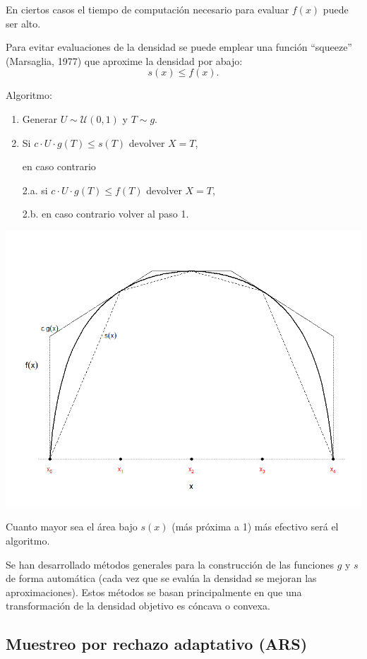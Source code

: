 \documentclass[
]{book}
\theoremstyle{break}
\theoremstyle{definition}
\theoremstyle{definition}
\theoremstyle{definition}
\theoremstyle{remark}
\begin{document}
En ciertos casos el tiempo de computación necesario para evaluar \(f(x)\) puede ser alto.

Para evitar evaluaciones de la densidad se puede emplear una función ``squeeze'' (Marsaglia, 1977) que aproxime la densidad por abajo:
\[s(x)\leq f(x).\]

Algoritmo:

\begin{enumerate}
\def\labelenumi{\arabic{enumi}.}
\item
  Generar \(U \sim \mathcal{U}(0, 1)\) y \(T\sim g\).
\item
  Si \(c\cdot U\cdot g\left( T\right) \leq s\left( T\right)\) devolver \(X=T\),

  en caso contrario

  2.a. si \(c\cdot U\cdot g\left( T\right) \leq f\left( T\right)\)
  devolver \(X=T\),

  2.b. en caso contrario volver al paso 1.
\end{enumerate}

\begin{center}\includegraphics[width=0.7\linewidth]{images/squeeze} \end{center}

Cuanto mayor sea el área bajo \(s(x)\) (más próxima a 1)
más efectivo será el algoritmo.

Se han desarrollado métodos generales para la construcción de las
funciones \(g\) y \(s\) de forma automática
(cada vez que se evalúa la densidad se mejoran las aproximaciones).
Estos métodos se basan principalmente en que una transformación de
la densidad objetivo es cóncava o convexa.

\hypertarget{muestreo-por-rechazo-adaptativo-ars}{%
\subsection{Muestreo por rechazo adaptativo (ARS)}\label{muestreo-por-rechazo-adaptativo-ars}}
\end{document}
